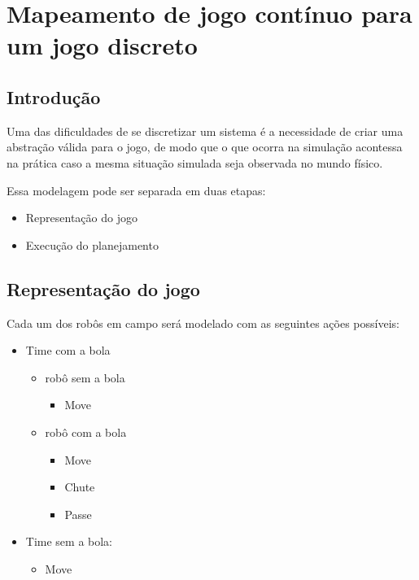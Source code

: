 \chapter{Mapeamento de jogo contínuo para um jogo discreto}\label{cap:mapeamento}

\section{Introdução}
Uma das dificuldades de se discretizar um sistema é a necessidade de criar uma
abstração válida para o jogo, de modo que o que ocorra na simulação acontessa na
prática caso a mesma situação simulada seja observada no mundo físico.

Essa modelagem pode ser separada em duas etapas:

\begin{itemize}
  \item Representação do jogo
  \item Execução do planejamento
\end{itemize}

\section{Representação do jogo}

Cada um dos robôs em campo será modelado com as seguintes ações possíveis:
\begin{itemize}
  \item Time com a bola
  \begin{itemize}
    \item robô sem a bola
    \begin{itemize}
       \item Move
    \end{itemize}
    \item robô com a bola
    \begin{itemize}
       \item Move
       \item Chute
       \item Passe
    \end{itemize}
  \end{itemize}
  \item Time sem a bola:
  \begin{itemize}
    \item Move
  \end{itemize}
\end{itemize}

